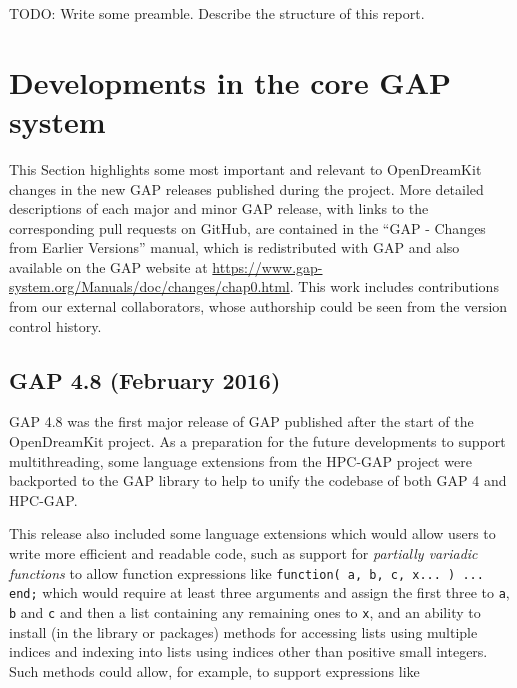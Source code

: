 \documentclass{deliverablereport}
\author{Author names}
\begin{document}
\maketitle
\githubissuedescription



TODO: Write some preamble. Describe the structure of this report.

\section{Developments in the core GAP system}\label{core-gap}

This Section highlights some most important and relevant to
OpenDreamKit changes in the new GAP releases published during the
project. More detailed descriptions of each major and minor
GAP release, with links to the corresponding pull requests on GitHub,
are contained in the ``GAP - Changes from Earlier Versions''
manual, which is redistributed with GAP and also available on the GAP
website at \url{https://www.gap-system.org/Manuals/doc/changes/chap0.html}.
This work includes contributions from our external collaborators, whose
authorship could be seen from the version control history.

\subsection{GAP 4.8 (February 2016)}\label{gap-4.8}

GAP 4.8 was the first major release of GAP published
after the start of the OpenDreamKit project.
As a preparation for the future developments to support multithreading, 
some language extensions from the HPC-GAP project were backported to the 
GAP library to help to unify the codebase of both GAP 4 and HPC-GAP. 

This release also included some language extensions which would allow users to write
more efficient and readable code, such as support for \emph{partially variadic functions}
to allow function expressions like
\verb|function( a, b, c, x... ) ... end;|
which would require at least three arguments and assign the first 
three to \verb|a|, \verb|b| and \verb|c| and then a list containing 
any remaining ones to \verb|x|, and an ability to install (in the library 
or packages) methods for accessing lists using multiple indices 
and indexing into lists using indices other than positive small integers. 
Such methods could allow, for example, to support expressions like
\end{document}
